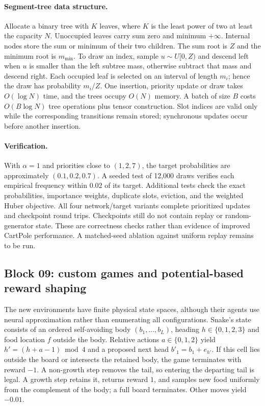 \documentclass[11pt,a4paper]{article}
\begin{document}
\paragraph{Segment-tree data structure.} Allocate a binary tree with $K$ leaves,
where $K$ is the least power of two at least the capacity $N$. Unoccupied leaves
carry sum zero and minimum $+\infty$. Internal nodes store the sum or minimum of
their two children. The sum root is $Z$ and the minimum root is $m_{\min}$.
To draw an index, sample $u\sim U[0,Z)$ and descend left when $u$ is smaller
than the left subtree mass, otherwise subtract that mass and descend right.
Each occupied leaf is selected on an interval of length $m_i$; hence the draw
has probability $m_i/Z$. One insertion, priority update or draw takes
$O(\log N)$ time, and the trees occupy $O(N)$ memory. A batch of size $B$ costs
$O(B\log N)$ tree operations plus tensor construction. Slot indices are valid
only while the corresponding transitions remain stored; synchronous updates
occur before another insertion.

\paragraph{Verification.} With $\alpha=1$ and priorities close to $(1,2,7)$,
the target probabilities are approximately $(0.1,0.2,0.7)$. A seeded test of
12,000 draws verifies each empirical frequency within 0.02 of its target.
Additional tests check the exact probabilities, importance weights, duplicate
slots, eviction, and the weighted Huber objective. All four network/target
variants complete prioritized updates and checkpoint round trips. Checkpoints
still do not contain replay or random-generator state. These are correctness
checks rather than evidence of improved CartPole performance. A matched-seed
ablation against uniform replay remains to be run.

\subsection{Block 09: custom games and potential-based reward shaping}
The new environments have finite physical state spaces, although their agents
use neural approximation rather than enumerating all configurations. Snake's
state consists of an ordered self-avoiding body $(b_1,\ldots,b_L)$, heading
$h\in\{0,1,2,3\}$ and food location $f$ outside the body. Relative actions
$a\in\{0,1,2\}$ yield $h'=(h+a-1)\bmod 4$ and a proposed next head
$b'_1=b_1+e_{h'}$. If this cell lies outside the board or intersects the
retained body, the game terminates with reward $-1$. A non-growth step removes
the tail, so entering the departing tail is legal. A growth step retains it,
returns reward $1$, and samples new food uniformly from the complement of the
body; a full board terminates. Other moves yield $-0.01$.
\end{document}

